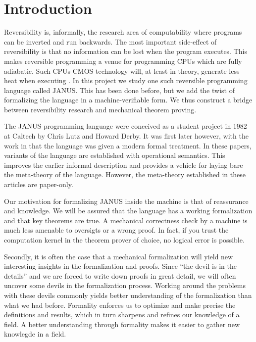 \chapter{Introduction}

Reversibility is, informally, the research area of computability where
programs can be inverted and run backwards. The most important
side-effect of reversibility is that no information can be lost when
the program executes. This makes reversible programming a venue for
programming CPUs which are fully adiabatic. Such CPUs CMOS technology
will, at least in theory, generate less heat when executing
. In this project we study one such reversible programming
language called JANUS. This has been done before, but we add the twist
of formalizing the language in a machine-verifiable form. We thus
construct a bridge between reversibility research and mechanical
theorem proving.

The JANUS programming language were conceived as a student project in
1982 at Caltech by Chris Lutz and Howard Derby. It was first later
however, with the work in \cite{glueck+2007, glueck+2008} that the
language was given a modern formal treatment. In these papers,
variants of the language are established with operational
semantics. This improves the earlier informal description and provides
a vehicle for laying bare the meta-theory of the language. However,
the meta-theory established in these articles are paper-only.

Our motivation for formalizing JANUS inside the machine is that of
reassurance and knowledge. We will be assured that the language has a
working formalization and that key theorems are true. A mechanical
correctness check by a machine is much less amenable to oversigts or a
wrong proof. In fact, if you trust the computation kernel in the
theorem prover of choice, no logical error is possible.

Secondly, it is often the case that a mechanical formalization will
yield new interesting insights in the formalization and proofs. Since
``the devil is in the details'' and we are forced to write down proofs
in great detail, we will often uncover some devils in the
formalization process. Working around the problems with these devils
commonly yields better understanding of the formalization than what we
had before. Formality enforces us to optimize and make precise the
definitions and results, which in turn sharpens and refines our
knowledge of a field. A better understanding through formality makes
it easier to gather new knowlegde in a field.

